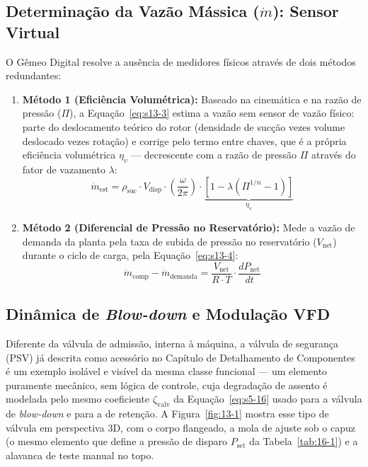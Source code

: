 \documentclass[12pt,a4paper]{article}
\numberwithin{equation}{section}
\numberwithin{table}{section}
\numberwithin{figure}{section}
\begin{document}
{	\subsection{\textbf{Determinação da Vazão Mássica (\texorpdfstring{$\dot{m}$}{ṁ}): Sensor Virtual}}
	O Gêmeo Digital resolve a ausência de medidores físicos através de dois métodos redundantes:
	\begin{enumerate}
		\item \textbf{Método 1 (Eficiência Volumétrica):} Baseado na cinemática e na razão de pressão ($\Pi$), a Equação~\eqref{eq:s13-3} estima a vazão sem sensor de vazão físico: parte do deslocamento teórico do rotor (densidade de sucção vezes volume deslocado vezes rotação) e corrige pelo termo entre chaves, que é a própria eficiência volumétrica $\eta_v$ — decrescente com a razão de pressão $\Pi$ através do fator de vazamento $\lambda$:
		\begin{equation}\label{eq:s13-3}
 \dot{m}_{\text{est}} = \rho_{\text{suc}} \cdotp V_{\text{disp}} \cdotp \left( \frac{\omega}{2\pi} \right) \cdotp \underbrace{[1 - \lambda (\Pi^{1/n} - 1)]}_{\eta_v}
\end{equation}
		\item \textbf{Método 2 (Diferencial de Pressão no Reservatório):} Mede a vazão de demanda da planta pela taxa de subida de pressão no reservatório ($V_{\text{net}}$) durante o ciclo de carga, pela Equação~\eqref{eq:s13-4}:
		\begin{equation}\label{eq:s13-4}
 \dot{m}_{\text{comp}} - \dot{m}_{\text{demanda}} = \frac{V_{\text{net}}}{R \cdotp T} \cdotp \frac{dP_{\text{net}}}{dt} 
\end{equation}
	\end{enumerate}
	
	\subsection{\textbf{Dinâmica de \textit{Blow-down} e Modulação VFD}}
	Diferente da válvula de admissão, interna à máquina, a válvula de segurança (PSV) já descrita como acessório no Capítulo de Detalhamento de Componentes é um exemplo isolável e visível da mesma classe funcional — um elemento puramente mecânico, sem lógica de controle, cuja degradação de assento é modelada pelo mesmo coeficiente $\zeta_{\text{valv}}$ da Equação~\eqref{eq:s5-16} usado para a válvula de \textit{blow-down} e para a de retenção. A Figura~\ref{fig:13-1} mostra esse tipo de válvula em perspectiva 3D, com o corpo flangeado, a mola de ajuste sob o capuz (o mesmo elemento que define a pressão de disparo $P_{\text{set}}$ da Tabela~\ref{tab:16-1}) e a alavanca de teste manual no topo.

}
\end{document}
